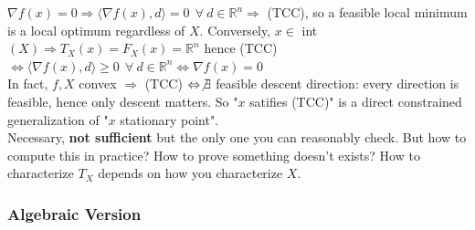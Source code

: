 \documentclass[10pt]{report}
\begin{document}
$\nabla f(x) = 0\Rightarrow \langle\nabla f(x),d\rangle = 0\:\:\forall\:d\in \mathbb{R}^n \Rightarrow$ (TCC), so a feasible local minimum is a local optimum regardless of $X$. Conversely, $x\in$ int$(X)\Rightarrow T_X(x) = F_X(x) = \mathbb{R}^n$ hence (TCC) $\Leftrightarrow\langle\nabla f(x),d\rangle \geq 0\:\:\forall\:d\in \mathbb{R}^n\Leftrightarrow \nabla f(x) = 0$\\
In fact, $f,X$ convex $\Rightarrow$ (TCC) $\Leftrightarrow \not\exists$ feasible descent direction: every direction is feasible, hence only descent matters. So "$x$ satifies (TCC)" is a direct constrained generalization of "$x$ stationary point".\\
Necessary, \textbf{not sufficient} but the only one you can reasonably check. But how to compute this in practice? How to prove something doesn't exists? How to characterize $T_X$ depends on how you characterize $X$.
\subsubsection{Algebraic Version}
\end{document}

